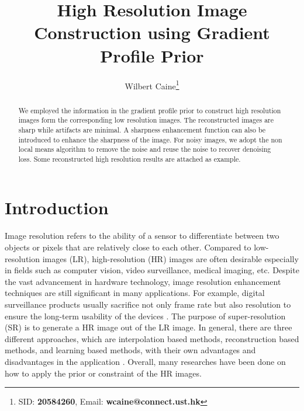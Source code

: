 \documentclass[a4paper,11pt]{article}
\title{High Resolution Image Construction using Gradient Profile Prior}
\author{
Wilbert Caine\thanks{SID: {\bf 20584260}, Email: {\bf wcaine@connect.ust.hk}}
}
\begin{document}
\thispagestyle{plain}
\maketitle


\begin{abstract}
We employed the information in the gradient profile prior to construct high resolution images form the corresponding low resolution images. The reconstructed images are sharp while artifacts are minimal. A sharpness enhancement function can also be introduced to enhance the sharpness of the image. For noisy images, we adopt the non local means algorithm to remove the noise and reuse the noise to recover denoising loss. Some reconstructed high resolution results are attached as example.
\end{abstract}


\section{Introduction}

Image resolution refers to the ability of a sensor to differentiate between two objects or pixels that are relatively close to each other. Compared to low-resolution images (LR), high-resolution (HR) images are often desirable especially in fields such as computer vision, video surveillance, medical imaging, etc. Despite the vast advancement in hardware technology, image resolution enhancement techniques are still significant in many applications. For example, digital surveillance products usually sacrifice not only frame rate but also resolution to ensure the long-term usability of the devices \cite{in16}. The purpose of super-resolution (SR) is to generate a HR image out of the LR image. In general, there are three different approaches, which are interpolation based methods, reconstruction based methods, and learning based methods, with their own advantages and disadvantages in the application \cite{sr11}. Overall, many researches have been done on how to apply the prior or constraint of the HR images.
\end{document}
